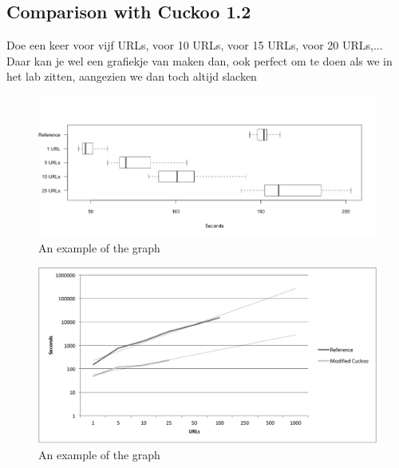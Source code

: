 \restoregeometry
\subsection{Comparison with Cuckoo 1.2}

Doe een keer voor vijf URLs, voor 10 URLs, voor 15 URLs, voor 20 URLs,...
Daar kan je wel een grafiekje van maken dan, ook perfect om te doen
als we in het lab zitten, aangezien we dan toch altijd slacken


\begin{figure}[h]
    \centering
    \centerline{\includegraphics[width=20cm]{Images/chart-box.png}}
    \caption{An example of the graph}
    \label{fig:graph}
\end{figure}

\begin{figure}[h]
    \centering
    \centerline{\includegraphics[width=20cm]{Images/chart-trend}}
    \caption{An example of the graph}
    \label{fig:graph}
\end{figure}
